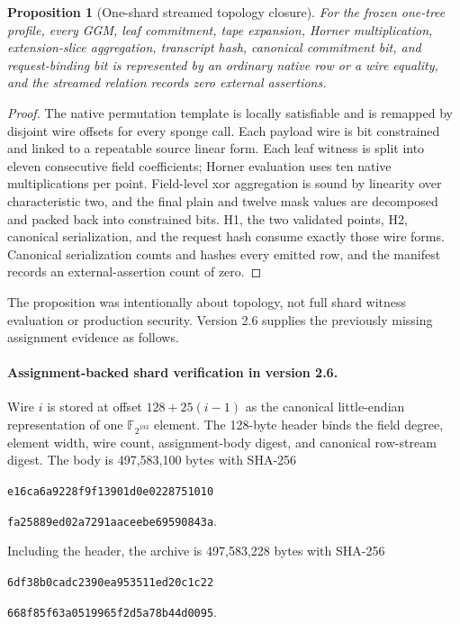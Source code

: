 \documentclass[11pt]{article}
\newtheorem{proposition}[definition]{Proposition}
\begin{document}
\begin{proposition}[One-shard streamed topology closure]
For the frozen one-tree profile, every GGM, leaf commitment, tape expansion,
Horner multiplication, extension-slice aggregation, transcript hash,
canonical commitment bit, and request-binding bit is represented by an
ordinary native row or a wire equality, and the streamed relation records zero
external assertions.
\end{proposition}
\begin{proof}
The native permutation template is locally satisfiable and is remapped by
disjoint wire offsets for every sponge call.  Each payload wire is bit
constrained and linked to a repeatable source linear form.  Each leaf witness
is split into eleven consecutive field coefficients; Horner evaluation uses
ten native multiplications per point.  Field-level xor aggregation is sound by
linearity over characteristic two, and the final plain and twelve mask values
are decomposed and packed back into constrained bits.  H1, the two validated
points, H2, canonical serialization, and the request hash consume exactly
those wire forms.  Canonical serialization counts and hashes every emitted
row, and the manifest records an external-assertion count of zero.
\end{proof}

The proposition was intentionally about topology, not full shard witness
evaluation or production security.  Version 2.6 supplies the previously
missing assignment evidence as follows.

\paragraph{Assignment-backed shard verification in version 2.6.}
Wire $i$ is stored at offset $128+25(i-1)$ as the canonical little-endian
representation of one $\mathbb F_{2^{193}}$ element.  The 128-byte header binds
the field degree, element width, wire count, assignment-body digest, and
canonical row-stream digest.  The body is 497,583,100 bytes with SHA-256
\begin{center}
\texttt{e16ca6a9228f9f13901d0e0228751010}\par\vspace{-0.2em}
\texttt{fa25889ed02a7291aaceebe69590843a}.
\end{center}
Including the header, the archive is 497,583,228 bytes with SHA-256
\begin{center}
\texttt{6df38b0cadc2390ea953511ed20c1c22}\par\vspace{-0.2em}
\texttt{668f85f63a0519965f2d5a78b44d0095}.
\end{center}
\end{document}
